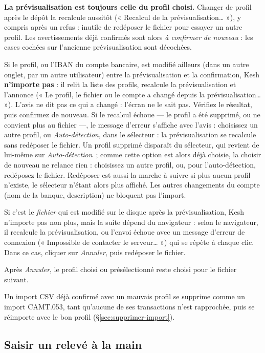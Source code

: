 \documentclass[a4paper,11pt,oneside]{article}
\begin{document}
\begin{keshwarning}
\textbf{La prévisualisation est toujours celle du profil choisi.} Changer de profil après le dépôt
la recalcule aussitôt (« Recalcul de la prévisualisation… »), y compris après un refus : inutile de
redéposer le fichier pour essayer un autre profil. Les avertissements déjà confirmés sont alors
\emph{à confirmer de nouveau} : les cases cochées sur l'ancienne prévisualisation sont décochées.

Si le profil, ou l'IBAN du compte bancaire, est modifié ailleurs (dans un autre onglet, par un
autre utilisateur) entre la prévisualisation et la confirmation, Kesh \textbf{n'importe pas} : il
relit la liste des profils, recalcule la prévisualisation et l'annonce (« Le profil, le fichier ou
le compte a changé depuis la prévisualisation… »). L'avis ne dit pas ce qui a changé : l'écran ne
le sait pas. Vérifiez le résultat, puis confirmez de nouveau. Si le recalcul échoue --- le profil a
été supprimé, ou ne convient plus au fichier ---, le message d'erreur s'affiche avec l'avis :
choisissez un autre profil, ou \emph{Auto-détection}, dans le sélecteur : la prévisualisation se
recalcule sans redéposer le fichier. Un profil supprimé disparaît du sélecteur, qui revient de
lui-même sur \emph{Auto-détection}~; comme cette option est alors déjà choisie, la choisir de
nouveau ne relance rien : choisissez un autre profil, ou, pour l'auto-détection, redéposez le
fichier. Redéposer est aussi la marche à suivre si plus aucun profil n'existe, le sélecteur n'étant
alors plus affiché. Les autres
changements du compte (nom de la banque, description) ne bloquent pas l'import.

Si c'est le \emph{fichier} qui est modifié sur le disque après la prévisualisation, Kesh n'importe
pas non plus, mais la suite dépend du navigateur : selon le navigateur, il recalcule la
prévisualisation, ou l'envoi échoue avec un message d'erreur de connexion (« Impossible de
contacter le serveur… ») qui se répète à chaque clic. Dans ce cas, cliquer sur \emph{Annuler}, puis
redéposer le fichier.

Après \emph{Annuler}, le profil choisi ou présélectionné reste choisi pour le fichier suivant.
\end{keshwarning}

Un import CSV déjà confirmé avec un mauvais profil se supprime comme un import CAMT.053, tant
qu'aucune de ses transactions n'est rapprochée, puis se réimporte avec le bon profil
(\S\ref{sec:supprimer-import}).

\subsection{Saisir un relevé à la main}\label{sec:releve-manuel}
\end{document}
